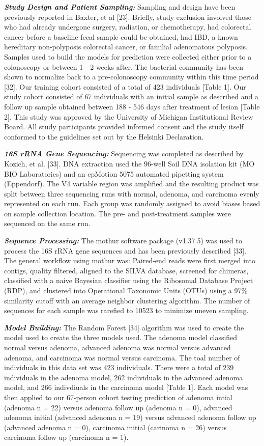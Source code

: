 \documentclass[12pt,]{article}
\begin{document}
\textbf{\emph{Study Design and Patient Sampling:}} Sampling and design
have been previously reported in Baxter, et al {[}23{]}. Briefly, study
exclusion involved those who had already undergone surgery, radiation,
or chemotherapy, had colorectal cancer before a baseline fecal sample
could be obtained, had IBD, a known hereditary non-polyposis colorectal
cancer, or familial adenomatous polyposis. Samples used to build the
models for prediction were collected either prior to a colonoscopy or
between 1 - 2 weeks after. The bacterial community has been shown to
normalize back to a pre-colonoscopy community within this time period
{[}32{]}. Our training cohort consisted of a total of 423 individuals
{[}Table 1{]}. Our study cohort consisted of 67 individuals with an
initial sample as described and a follow up sample obtained between 188
- 546 days after treatment of lesion {[}Table 2{]}. This study was
approved by the University of Michigan Institutional Review Board. All
study participants provided informed consent and the study itself
conformed to the guidelines set out by the Helsinki Declaration.

\textbf{\emph{16S rRNA Gene Sequencing:}} Sequencing was completed as
described by Kozich, et al. {[}33{]}. DNA extraction used the 96-well
Soil DNA isolation kit (MO BIO Laboratories) and an epMotion 5075
automated pipetting system (Eppendorf). The V4 variable region was
amplified and the resulting product was split between three sequencing
runs with normal, adenoma, and carcinoma evenly represented on each run.
Each group was randomly assigned to avoid biases based on sample
collection location. The pre- and post-treatment samples were sequenced
on the same run.

\textbf{\emph{Sequence Processing:}} The mothur software package
(v1.37.5) was used to process the 16S rRNA gene sequences and has been
previously described {[}33{]}. The general workflow using mothur was:
Paired-end reads were first merged into contigs, quality filtered,
aligned to the SILVA database, screened for chimeras, classified with a
naive Bayesian classifier using the Ribosomal Database Project (RDP),
and clustered into Operational Taxonomic Units (OTUs) using a 97\%
similarity cutoff with an average neighbor clustering algorithm. The
number of sequences for each sample was rarefied to 10523 to minimize
uneven sampling.

\textbf{\emph{Model Building:}} The Random Forest {[}34{]} algorithm was
used to create the model used to create the three models used. The
adenoma model classified normal versus adenoma, advanced adenoma was
normal versus advanced adenoma, and carcinoma was normal versus
carcinoma. The toal number of individuals in this data set was 423
individuals. There were a total of 239 individuals in the adenoma model,
262 individuals in the advanced adenoma model, and 266 indivdiuals in
the carcinoma model {[}Table 1{]}. Each model was then applied to our
67-person cohort testing prediction of adenoma intial (adenoma n = 22)
versus adenoma follow up (adenoma n = 0), advanced adenoma initial
(advanced adenoma n = 19) versus advanced adenoma follow up (advanced
adenoma n = 0), carcinoma initial (carinoma n = 26) versus carcinoma
follow up (carcinoma n = 1).
\end{document}

